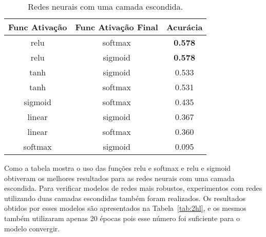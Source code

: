 \documentclass[conference]{IEEEtran}
\begin{document}
\begin{table}[h!]
	\centering
	
	\begin{tabular}{ccc} \toprule
		\textbf{Func Ativação} & \textbf{Func Ativação Final} & \textbf{Acurácia} \\ \toprule 
		relu                   & softmax                      & \textbf{0.578}             \\
		relu                   & sigmoid                      & \textbf{0.578}             \\
		tanh                   & sigmoid                      & 0.533             \\
		tanh                   & softmax                      & 0.531             \\	
		sigmoid                & softmax                      & 0.435             \\
		linear                 & sigmoid                      & 0.367             \\
		linear                 & softmax                      & 0.360             \\
		
		softmax                & sigmoid                      & 0.095      \\ \bottomrule      
	\end{tabular}
	\caption{Redes neurais com uma camada escondida.}
	\label{tab:1hl}
\end{table}

Como a tabela mostra o uso das funções relu e softmax e relu e sigmoid obtiveram os melhores resultados para as redes neurais com uma camada escondida. Para verificar modelos de redes mais robustos, experimentos com redes utilizando duas camadas escondidas também foram realizados. Os resultados obtidos por esses modelos são apresentados na Tabela~\ref{tab:2hl}, e os mesmos também utilizaram apenas 20 épocas pois esse número foi suficiente para o modelo convergir.
\end{document}
